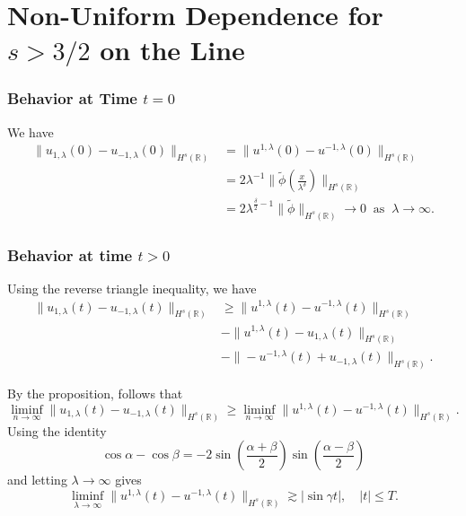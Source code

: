 \documentclass{beamer}
\newcommand{\rr}{\mathbb{R}}
\begin{document}
\section{Non-Uniform Dependence for $s>3/2$ on the Line}
\begin{frame}
	\frametitle{Behavior at Time $t=0$}  We have
%
%
%
%
\begin{equation*}
\begin{split}
\|u_{1,\lambda}(0) - u_{-1,\lambda}(0) \|_{H^s(\rr)} & = \|u^{1,\lambda}(0) 
- u^{-1,\lambda}(0) \|_{H^s(\rr)}
\\
& = 2 \lambda^{-1} \| \tilde{\phi}\left( \frac{x}{\lambda^\delta} \right) 
\|_{H^s(\rr)}
\\
& = 2
\lambda^{\frac{\delta}{2}-1} \|\tilde{\phi} \|_{H^s(\rr)} \to 0
\; \; \text{as} \; \; \lambda \to \infty.
\end{split}
\end{equation*}


\end{frame}
%
%

\begin{frame}
	\frametitle{Behavior at time  $t>0$}
%
%
%  
%

Using the reverse triangle inequality, we 
have
%
%
%
%
%
\begin{equation*} \label{appleHR-slns-differ-t-pos}
\begin{split}
\|
u_{1,\lambda}(t)
-
u_{- 1,\lambda}(t)
\|_{H^s(\rr)}
&
\ge
\|
u^{1,\lambda}(t)
-
u^{- 1,\lambda}(t)
\|_{H^s(\rr)}
\\
& -
\|
u^{1,\lambda}(t)
-
u_{1,\lambda}(t)
\|_{H^s(\rr)}
\\
& -
\|
-u^{-1,\lambda}(t)
+
u_{-1,\lambda}(t)
\|_{H^s(\rr)}.
\end{split}
\end{equation*}
%
%
%
\end{frame}
\begin{frame}
%
By the proposition, follows that
%
%
%
%
%
%
%
\begin{equation*} \label{appleHR-slns-to-ap-est}
\liminf_{n\to\infty}
\|
u_{1,\lambda}(t)
-
u_{- 1,\lambda}(t)
\|_{H^s(\rr)}
\ge
\liminf_{n\to\infty}
\|
u^{1,\lambda}(t)
-
u^{- 1,\lambda}(t)
\|_{H^s(\rr)}.
\end{equation*}
%
%
%
%
\pause
Using the identity $$
\cos \alpha -\cos \beta
=
-2
\sin(\frac{\alpha + \beta}{2})
\sin(\frac{\alpha - \beta}{2})
$$
and letting $\lambda \to \infty$
gives
%
%
%
%
%
%
\begin{equation*} \label{apple91}
\liminf_{\lambda \to\infty}
\|
u^{1,\lambda}(t)
-
u^{- 1,\lambda}(t)
\|_{H^s(\rr)}
\gtrsim
|\sin \gamma t|, \quad |t| \le T.
\end{equation*}
%
%
\end{frame}
\end{document}
